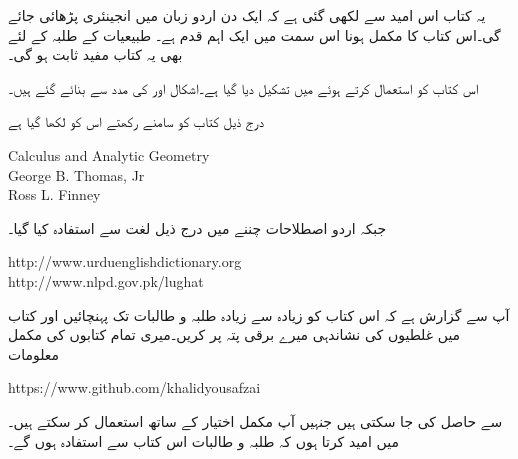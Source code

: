 یہ کتاب اس امید سے لکھی گئی ہے کہ ایک دن اردو زبان میں انجینئری پڑھائی جائے گی۔اس کتاب کا مکمل ہونا اس سمت میں ایک اہم قدم ہے۔ طبیعیات کے طلبہ کے لئے بھی یہ کتاب مفید ثابت ہو گی۔ 

اس کتاب کو  استعمال کرتے ہوئے  میں تشکیل دیا گیا ہے۔اشکال  اور  کی مدد سے بنائے گئے ہیں۔

درج ذیل کتاب کو سامنے رکھتے اس کو لکھا گیا ہے

{
\begin{otherlanguage}{english}
Calculus and Analytic Geometry\\
George B. Thomas, Jr\\
Ross L. Finney
\end{otherlanguage}
}

جبکہ اردو اصطلاحات چننے میں درج ذیل لغت سے استفادہ  کیا گیا۔

{
\begin{otherlanguage}{english}
http:/\!\!/www.urduenglishdictionary.org\\
http:/\!\!/www.nlpd.gov.pk/lughat
\end{otherlanguage}
}

آپ سے گزارش ہے کہ اس کتاب کو زیادہ سے زیادہ طلبہ و طالبات تک پہنچائیں اور کتاب میں غلطیوں کی نشاندہی میرے  برقی پتہ پر کریں۔میری تمام کتابوں کی مکمل  معلومات

{
\begin{otherlanguage}{english}
https:/\!\!/www.github.com/khalidyousafzai
\end{otherlanguage}
}

سے حاصل کی جا سکتی ہیں جنہیں آپ مکمل اختیار کے ساتھ استعمال کر سکتے ہیں۔میں امید کرتا ہوں کہ طلبہ و طالبات اس کتاب سے استفادہ ہوں گے۔
\vspace{5mm}

{}


